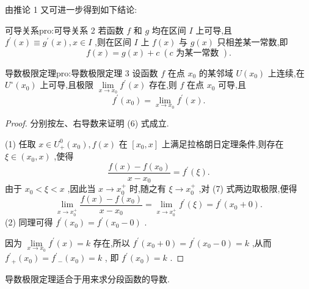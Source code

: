 由推论 1 又可进一步得到如下结论:

\begin{corollary}{可导关系}{pro:可导关系}
2 若函数 \(f\) 和 \(g\) 均在区间 \(I\) 上可导,且 \({f}^{\prime }\left( x\right)  \equiv  {g}^{\prime }\left( x\right) ,x \in  I\) ,则在区间 \(I\) 上 \(f\left( x\right)\) 与 \(g\left( x\right)\) 只相差某一常数,即
\[
f\left( x\right)  = g\left( x\right)  + c\;\left( {c\text{ 为某一常数 }}\right) .
\]
\end{corollary}


\begin{corollary}{导数极限定理}{pro:导数极限定理}
3 设函数 \(f\) 在点 \({x}_{0}\) 的某邻域 \(U\left( {x}_{0}\right)\) 上连续,在 \({U}^{ \circ  }\left( {x}_{0}\right)\) 上可导,且极限 \(\mathop{\lim }\limits_{{x \rightarrow  {x}_{0}}}{f}^{\prime }\left( x\right)\) 存在,则 \(f\) 在点 \({x}_{0}\) 可导,且
\[
{f}^{\prime }\left( {x}_{0}\right)  = \mathop{\lim }\limits_{{x \rightarrow  {x}_{0}}}{f}^{\prime }\left( x\right) . \tag{6}
\]
\end{corollary}

\begin{proof}
分别按左、右导数来证明 (6) 式成立.

(1) 任取 \(x \in  {U}_{ + }^{0}\left( {x}_{0}\right) ,f\left( x\right)\) 在 \(\left\lbrack  {{x}_{0},x}\right\rbrack\) 上满足拉格朗日定理条件,则存在 \(\xi  \in  \left( {{x}_{0},x}\right)\) ,使得
\[
\frac{f\left( x\right)  - f\left( {x}_{0}\right) }{x - {x}_{0}} = {f}^{\prime }\left( \xi \right) . \tag{7}
\]
由于 \({x}_{0} < \xi  < x\) ,因此当 \(x \rightarrow  {x}_{0}^{ + }\) 时,随之有 \(\xi  \rightarrow  {x}_{0}^{ + }\) ,对 (7) 式两边取极限,便得
\[
\mathop{\lim }\limits_{{x \rightarrow  {x}_{0}^{ + }}}\frac{f\left( x\right)  - f\left( {x}_{0}\right) }{x - {x}_{0}} = \mathop{\lim }\limits_{{x \rightarrow  {x}_{0}^{ + }}}{f}^{\prime }\left( \xi \right)  = {f}^{\prime }\left( {{x}_{0} + 0}\right) .
\]
(2) 同理可得 \({f}^{\prime }\left( {x}_{0}\right)  = {f}^{\prime }\left( {{x}_{0} - 0}\right)\) .

因为 \(\mathop{\lim }\limits_{{x \rightarrow  {x}_{0}}}{f}^{\prime }\left( x\right)  = k\) 存在,所以 \({f}^{\prime }\left( {{x}_{0} + 0}\right)  = {f}^{\prime }\left( {{x}_{0} - 0}\right)  = k\) ,从而 \({f}^{\prime }{}_{ + }\left( {x}_{0}\right)  = {f}^{\prime }{}_{ - }\left( {x}_{0}\right)  = k\) , 即 \({f}^{\prime }\left( {x}_{0}\right)  = k\) .
\end{proof}


导数极限定理适合于用来求分段函数的导数.

